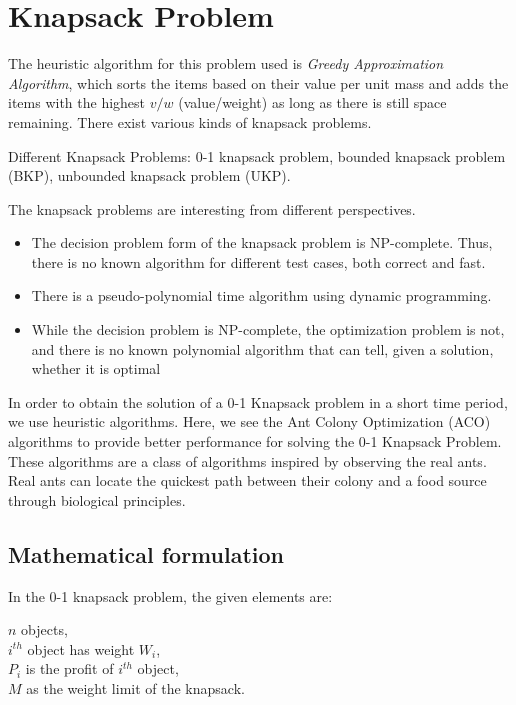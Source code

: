 \documentclass[conference]{IEEEtran}
\begin{document}
\section{\textbf{Knapsack Problem}}
The heuristic algorithm for this problem used is \textit{Greedy Approximation Algorithm}, which sorts the items based on their value per unit mass and adds the items with the highest $v/w$ (value/weight) as long as there is still space remaining. There exist various kinds of knapsack problems.

\par
Different Knapsack Problems: 0-1 knapsack problem, bounded knapsack problem (BKP), unbounded knapsack problem (UKP).

The knapsack problems are interesting from different perspectives. 
\begin{itemize}
	\item The decision problem form of the knapsack problem is NP-complete. Thus, there is no known algorithm for different test cases, both correct and fast.
	\item There is a pseudo-polynomial time algorithm using dynamic programming.
	\item While the decision problem is NP-complete, the optimization problem is not, and there is no known polynomial algorithm that can tell, given a solution, whether it is optimal
\end{itemize}

In order to obtain the solution of a 0-1 Knapsack problem in a short time period, we use heuristic algorithms. Here, we see the Ant Colony Optimization (ACO) algorithms to provide better performance for solving the 0-1 Knapsack Problem. These algorithms are a class of algorithms inspired by observing the real ants. Real ants can locate the quickest path between their colony and a food source through biological principles.

\subsection {Mathematical formulation}
In the 0-1 knapsack problem, the given elements are:

\begin{center}
    $n$ objects,\\
    $i^{th}$ object has weight $W_i$,\\
    $P_i$ is the profit of $i^{th}$ object,\\
    $M$ as the weight limit of the knapsack.
\end{center}
\end{document}
